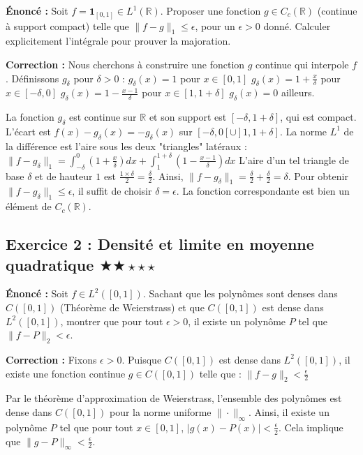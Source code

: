 \documentclass[11pt,a4paper]{article}
\begin{document}
\textbf{Énoncé :}
Soit $f = \mathbf{1}_{[0, 1]} \in L^1(\mathbb{R})$.
Proposer une fonction $g \in C_c(\mathbb{R})$ (continue à support compact) telle que $\| f - g \|_1 \le \epsilon$, pour un $\epsilon > 0$ donné. Calculer explicitement l'intégrale pour prouver la majoration.

\textbf{Correction :}
Nous cherchons à construire une fonction $g$ continue qui interpole $f$. Définissons $g_\delta$ pour $\delta > 0$ :
$g_\delta(x) = 1$ pour $x \in [0, 1]$
$g_\delta(x) = 1 + \frac{x}{\delta}$ pour $x \in [-\delta, 0]$
$g_\delta(x) = 1 - \frac{x-1}{\delta}$ pour $x \in [1, 1+\delta]$
$g_\delta(x) = 0$ ailleurs.

La fonction $g_\delta$ est continue sur $\mathbb{R}$ et son support est $[-\delta, 1+\delta]$, qui est compact.
L'écart est $f(x) - g_\delta(x) = -g_\delta(x)$ sur $[-\delta, 0[ \cup ]1, 1+\delta]$.
La norme $L^1$ de la différence est l'aire sous les deux "triangles" latéraux :
$\| f - g_\delta \|_1 = \int_{-\delta}^0 \left(1 + \frac{x}{\delta}\right) dx + \int_1^{1+\delta} \left(1 - \frac{x-1}{\delta}\right) dx$
L'aire d'un tel triangle de base $\delta$ et de hauteur $1$ est $\frac{1 \times \delta}{2} = \frac{\delta}{2}$.
Ainsi, $\| f - g_\delta \|_1 = \frac{\delta}{2} + \frac{\delta}{2} = \delta$.
Pour obtenir $\| f - g_\delta \|_1 \le \epsilon$, il suffit de choisir $\delta = \epsilon$.
La fonction correspondante est bien un élément de $C_c(\mathbb{R})$.


\subsection*{Exercice 2 : Densité et limite en moyenne quadratique \quad $\bigstar\bigstar\star\star\star$}

\textbf{Énoncé :}
Soit $f \in L^2([0,1])$. Sachant que les polynômes sont denses dans $C([0,1])$ (Théorème de Weierstrass) et que $C([0,1])$ est dense dans $L^2([0,1])$, montrer que pour tout $\epsilon > 0$, il existe un polynôme $P$ tel que $\|f - P\|_2 < \epsilon$.

\textbf{Correction :}
Fixons $\epsilon > 0$.
Puisque $C([0,1])$ est dense dans $L^2([0,1])$, il existe une fonction continue $g \in C([0,1])$ telle que :
$\| f - g \|_2 < \frac{\epsilon}{2}$

Par le théorème d'approximation de Weierstrass, l'ensemble des polynômes est dense dans $C([0,1])$ pour la norme uniforme $\| \cdot \|_\infty$.
Ainsi, il existe un polynôme $P$ tel que pour tout $x \in [0,1]$, $|g(x) - P(x)| < \frac{\epsilon}{2}$.
Cela implique que $\| g - P \|_\infty < \frac{\epsilon}{2}$.
\end{document}

